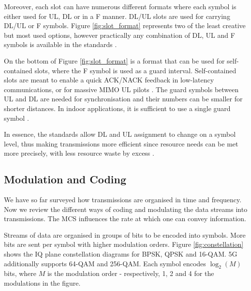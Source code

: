 
Moreover, each slot can have numerous different formats where each symbol is either used for UL, DL or in a \ac{F} manner. \ac{DL}/\ac{UL} slots are used for carrying \ac{DL}/\ac{UL} or \ac{F} symbols. Figure \ref{fig:slot_format} represents two of the least creative but most used options, however practically any combination of DL, UL and F symbols is available in the standards \cite{3gpp_slot_periodicity}. 


On the bottom of Figure \ref{fig:slot_format} is a format that can be used for self-contained slots, where the F symbol is used as a guard interval. Self-contained slots are meant to enable a quick ACK/NACK feedback in low-latency communications, or for massive MIMO UL pilots \cite{qualcomm_innovative_five}. The guard symbols between UL and DL are needed for synchronisation and their numbers can be smaller for shorter distances. In indoor applications, it is sufficient to use a single guard symbol \cite{rel15_self_contained_slot_qualcomm}.

In essence, the standards allow DL and UL assignment to change on a symbol level, thus making transmissions more efficient since resource needs can be met more precisely, with less resource waste by excess \cite{air_interface_system_principles}.


\subsection*{Modulation and Coding}

We have so far surveyed how transmissions are organised in time and frequency. Now we review the different ways of coding and modulating the data streams into transmissions. The \ac{MCS} influences the rate at which one can convey information.

Streams of data are organised in groups of bits to be encoded into symbols. More bits are sent per symbol with higher modulation orders. Figure \ref{fig:constellation} shows the \ac{IQ} plane constellation diagrams for \ac{BPSK}, \ac{QPSK} and 16-\ac{QAM}. 5G additionally supports 64-QAM and 256-QAM. Each symbol encodes $\log_2(M)$ bits, where $M$ is the modulation order - respectively, 1, 2 and 4 for the modulations in the figure.

